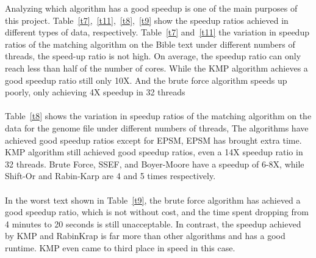 \documentclass[11pt]{article}       %
\newcommand{\includeFig}[3]      {\begin{figure}[htb] \begin{center}
                                 \includegraphics
                                 [width=4in,keepaspectratio] %
                                 {#2}\caption{\label{#1}#3} \end{center} \end{figure}}
\begin{document}
Analyzing which algorithm has a good speedup is one of the main purposes of this project. Table~\ref{t7},~\ref{t11},~\ref{t8},~\ref{t9} show the speedup ratios achieved in different types of data, respectively. Table~\ref{t7} and~\ref{t11}  the variation in speedup ratios of the matching algorithm on the Bible text under different numbers of threads, the speed-up ratio is not high. On average, the speedup ratio can only reach less than half of the number of cores. While the KMP algorithm achieves a good speedup ratio still only 10X. And the brute force algorithm speeds up poorly, only achieving 4X speedup in 32 threads\\ 
\\Table~\ref{t8} shows the variation in speedup ratios of the matching algorithm on the data for the genome file under different numbers of threads, The algorithms have achieved good speedup ratios except for EPSM, EPSM has brought extra time. KMP algorithm still achieved good speedup ratios, even a 14X speedup ratio in 32 threads. Brute Force, SSEF, and Boyer-Moore have a speedup of 6-8X, while Shift-Or and Rabin-Karp are 4 and 5 times respectively.\\
\\In the worst text shown in Table~\ref{t9}, the brute force algorithm has achieved a good speedup ratio, which is not without cost, and the time spent dropping from 4 minutes to 20 seconds is still unacceptable. In contrast, the speedup achieved by KMP and RabinKrap is far more than other algorithms and has a good runtime. KMP even came to third place in speed in this case.






\end{document}
